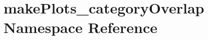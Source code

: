 \hypertarget{namespacemakePlots__categoryOverlap}{
\section{makePlots\_\-categoryOverlap Namespace Reference}
\label{namespacemakePlots__categoryOverlap}
}
